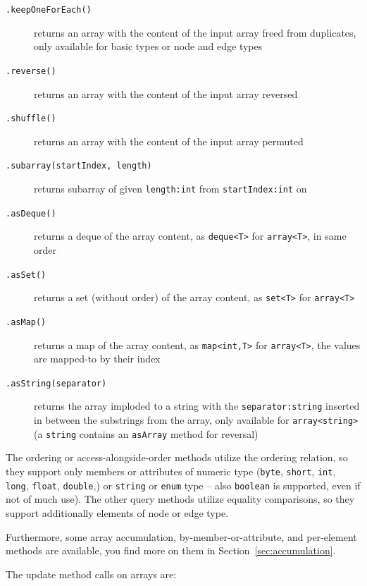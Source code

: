 \begin{description}
\item[\texttt{.keepOneForEach()}] returns an array with the content of the input array freed from duplicates, only available for basic types or node and edge types
\item[\texttt{.reverse()}] returns an array with the content of the input array reversed
\item[\texttt{.shuffle()}] returns an array with the content of the input array permuted
\item[\texttt{.subarray(startIndex, length)}] returns subarray of given \texttt{length:int} from \texttt{startIndex:int} on
\item[\texttt{.asDeque()}] returns a deque of the array content, as \verb#deque<T># for \verb#array<T>#, in same order
\item[\texttt{.asSet()}] returns a set (without order) of the array content, as \verb#set<T># for \verb#array<T>#
\item[\texttt{.asMap()}] returns a map of the array content, as \verb#map<int,T># for \verb#array<T>#, the values are mapped-to by their index
\item[\texttt{.asString(separator)}] returns the array imploded to a string with the \texttt{separator:string} inserted in between the substrings from the array, only available for \verb#array<string># (a \texttt{string} contains an \texttt{asArray} method for reversal)
\end{description}

The ordering or access-alongside-order methods utilize the ordering relation, so they support only members or attributes of numeric type (\texttt{byte}, \texttt{short}, \texttt{int}, \texttt{long}, \texttt{float}, \texttt{double},) or \texttt{string} or \texttt{enum} type -- also \texttt{boolean} is supported, even if not of much use).
The other query methods utilize equality comparisons, so they support additionally elements of node or edge type.

Furthermore, some array accumulation, by-member-or-attribute, and per-element methods are available, you find more on them in Section~\ref{sec:accumulation}.

\noindent The update method calls on arrays are:

